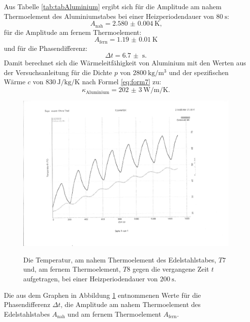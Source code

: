 Aus Tabelle \ref{tab:tabAluminium} ergibt sich für die Amplitude am nahem Thermoelement des Aluminiumstabes bei einer Heizperiodendauer von $\SI{80}{\second}$:
\begin{displaymath}
A_\text{nah} = \SI{2.580(4)}{\kelvin}\text{,}
\end{displaymath}
für die Amplitude am fernem Thermoelement:
\begin{displaymath}
A_\text{fern} = \SI{1.19(1)}{\kelvin}
\end{displaymath}
und für die Phasendifferenz:
\begin{displaymath}
\Delta t = \SI{6.7(0)}{\second}\text{.}
\end{displaymath}
Damit berechnet sich die Wärmeleitfähigkeit von Aluminium mit den Werten aus der Versuchsanleitung \cite{V204} für die Dichte $p$ von $\SI{2800}{\kilo\gram\per\meter\tothe{3}}$ und der spezifischen Wärme $c$ von $\SI{830}{\joule\per\kilo\gram\per\kelvin}$ nach Formel \eqref{eq:form7} zu:
\begin{displaymath}
\kappa_\text{Aluminium} = \SI{202(3)}{\watt\per\meter\per\kelvin}\text{.}
\end{displaymath}
\begin{figure}
	\centering
	\caption{Die Temperatur, am nahem Thermoelement des Edelstahlstabes, $T7$ und, am fernem Thermoelement, $T8$ gegen die vergangene Zeit $t$ aufgetragen, bei einer Heizperiodendauer von $\SI{200}{\second}$.}
	\includegraphics[width=\linewidth-70pt,height=\textheight-70pt,keepaspectratio]{content/Bilder/T7T8-rotated.pdf}
	\label{fig:Graph7}
\end{figure}
\begin{table}
	\centering
	\caption{Die aus dem Graphen in Abbildung \ref{fig:Graph7} entnommenen Werte für die Phasendifferenz $\Delta t$, die Amplitude am nahem Thermoelement des Edelstahlstabes $A_\text{nah}$ und am fernem Thermoelement $A_\text{fern}$.}
	
\end{table}

